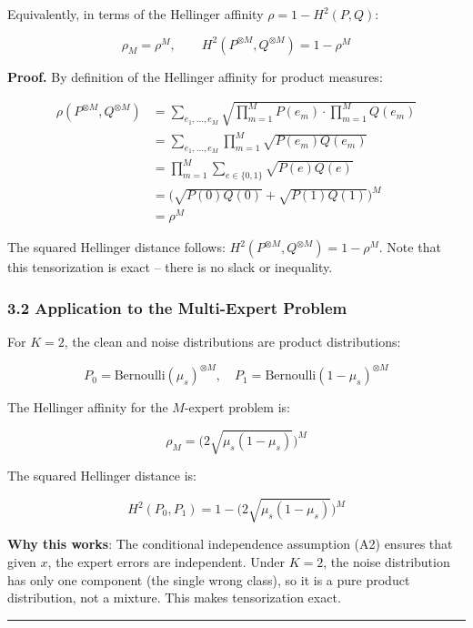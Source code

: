 \documentclass[
  12pt,
]{article}
\begin{document}
Equivalently, in terms of the Hellinger affinity
\(\rho = 1 - H^2(P, Q)\):

\[\rho_M = \rho^M, \qquad H^2(P^{\otimes M}, Q^{\otimes M}) = 1 - \rho^M\]

\textbf{Proof.} By definition of the Hellinger affinity for product
measures:

\[\begin{aligned}
\rho(P^{\otimes M}, Q^{\otimes M})
&= \sum_{e_1,\dots,e_M} \sqrt{\prod_{m=1}^M P(e_m) \cdot \prod_{m=1}^M Q(e_m)} \\
&= \sum_{e_1,\dots,e_M} \prod_{m=1}^M \sqrt{P(e_m) Q(e_m)} \\
&= \prod_{m=1}^M \sum_{e \in \{0,1\}} \sqrt{P(e) Q(e)} \\
&= \bigl(\sqrt{P(0)Q(0)} + \sqrt{P(1)Q(1)}\bigr)^M \\
&= \rho^M
\end{aligned}\]

The squared Hellinger distance follows:
\(H^2(P^{\otimes M}, Q^{\otimes M}) = 1 - \rho^M\). Note that this
tensorization is exact -- there is no slack or inequality.

\subsubsection{3.2 Application to the Multi-Expert
Problem}\label{application-to-the-multi-expert-problem}

For \(K=2\), the clean and noise distributions are product
distributions:

\[P_0 = \text{Bernoulli}(\mu_s)^{\otimes M}, \quad
P_1 = \text{Bernoulli}(1-\mu_s)^{\otimes M}\]

The Hellinger affinity for the \(M\)-expert problem is:

\[\rho_M = \bigl(2\sqrt{\mu_s(1-\mu_s)}\bigr)^M\]

The squared Hellinger distance is:

\[H^2(P_0, P_1) = 1 - \bigl(2\sqrt{\mu_s(1-\mu_s)}\bigr)^M\]

\textbf{Why this works}: The conditional independence assumption (A2)
ensures that given \(x\), the expert errors are independent. Under
\(K=2\), the noise distribution has only one component (the single wrong
class), so it is a pure product distribution, not a mixture. This makes
tensorization exact.

\begin{center}\rule{0.5\linewidth}{0.5pt}\end{center}
\end{document}
